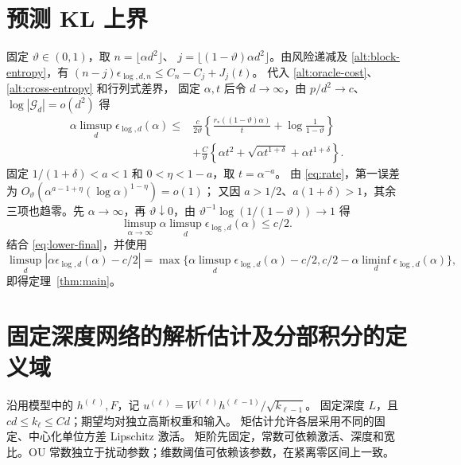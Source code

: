 \documentclass[a4paper]{tufte-handout}
\begin{document}
\begin{fullwidth}
\section{预测 KL 上界}
固定 $\vartheta\in(0,1)$，取 $n=\lfloor\alpha d^2\rfloor$、
$j=\lfloor(1-\vartheta)\alpha d^2\rfloor$。由风险递减及
\eqref{alt:block-entropy}，有
$(n-j)\epsilon_{\log,d,n}\le C_n-C_j+J_j(t)$。
代入 \eqref{alt:oracle-cost}、\eqref{alt:cross-entropy} 和行列式差界，
固定 $\alpha,t$ 后令 $d\to\infty$，由 $p/d^2\to c$、
$\log|\mathcal G_d|=o(d^2)$ 得
\begin{equation}\label{alt:limit-upper}\begin{aligned}
 \alpha\limsup_d\epsilon_{\log,d}(\alpha)
 \le{}&\frac c{2\vartheta}\left\{
 \frac{r_*((1-\vartheta)\alpha)}t+\log\frac1{1-\vartheta}\right\}\\
 &+\frac C\vartheta\left\{\alpha t^2+
       \sqrt{\alpha t^{1+\delta}}+\alpha t^{1+\delta}\right\}.
\end{aligned}\end{equation}
固定 $1/(1+\delta)<a<1$ 和 $0<\eta<1-a$，取 $t=\alpha^{-a}$。
由 \eqref{eq:rate}，第一误差为
$O_\vartheta(\alpha^{a-1+\eta}(\log\alpha)^{1-\eta})=o(1)$；
又因 $a>1/2$、$a(1+\delta)>1$，其余三项也趋零。先 $\alpha\to\infty$，再 $\vartheta\downarrow0$，由
$\vartheta^{-1}\log(1/(1-\vartheta))\to1$ 得
\[
 \limsup_{\alpha\to\infty}\alpha\limsup_d\epsilon_{\log,d}(\alpha)\le c/2.
\]
结合 \eqref{eq:lower-final}，并使用
\[
 \limsup_d|\alpha\epsilon_{\log,d}(\alpha)-c/2|
 =\max\{\alpha\limsup_d\epsilon_{\log,d}(\alpha)-c/2,
          c/2-\alpha\liminf_d\epsilon_{\log,d}(\alpha)\},
\]
即得定理~\ref{thm:main}。
\appendix
\section{固定深度网络的解析估计及分部积分的定义域}\label{an:appendix}\label{an:section}\label{app:local}
沿用模型中的 $h^{(\ell)},F$，记 $u^{(\ell)}=W^{(\ell)}h^{(\ell-1)}/\sqrt{k_{\ell-1}}$。
固定深度 $L$，且 $cd\le k_\ell\le Cd$；期望均对独立高斯权重和输入。
矩估计允许各层采用不同的固定、中心化单位方差 Lipschitz 激活。
矩阶先固定，常数可依赖激活、深度和宽比。OU 常数独立于扰动参数；维数阈值可依赖该参数，在紧离零区间上一致。


\end{fullwidth}
\end{document}
